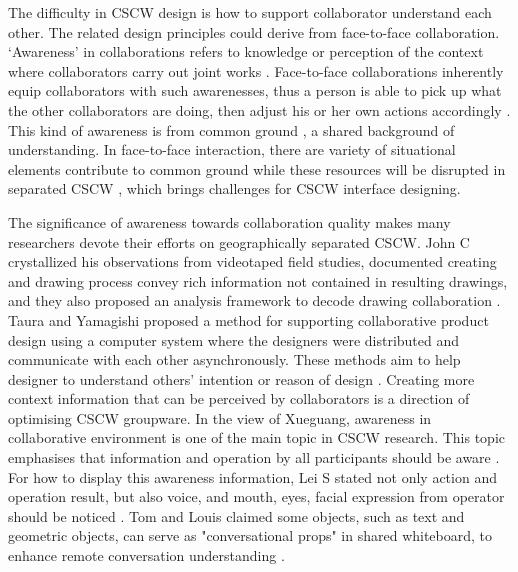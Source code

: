 \documentclass[12pt,twoside]{article}
\begin{document}
The difficulty in CSCW design is how to support collaborator understand each other. The related design principles could derive from face-to-face collaboration. ‘Awareness’ in collaborations refers to knowledge or perception of the context where collaborators carry out joint works \cite{gellersen2002multi}. Face-to-face collaborations inherently equip collaborators with such awarenesses, thus a person is able to pick up what the other collaborators are doing, then adjust his or her own actions accordingly \cite{gutwin2002descriptive}. This kind of awareness is from common ground \cite{clark1996using}, a shared background of understanding. In face-to-face interaction, there are variety of situational elements contribute to common ground while these resources will be disrupted in separated CSCW \cite{tang1991findings}, which brings challenges for CSCW interface designing. 

The significance of awareness towards collaboration quality makes many researchers devote their efforts on geographically separated CSCW. John C crystallized his observations from videotaped field studies, documented creating and drawing process convey rich information not contained in resulting drawings, and they also proposed an analysis framework to decode drawing collaboration \cite{tang1991findings}. Taura and Yamagishi proposed a method for supporting collaborative product design using a computer system where the designers were distributed and communicate with each other asynchronously. These methods aim to help designer to understand others’ intention or reason of design \cite{taura1997collaboration}. Creating more context information that can be perceived by collaborators is a direction of optimising CSCW groupware. In the view of Xueguang, awareness in collaborative environment is one of the main topic in CSCW research. This topic emphasises that information and operation by all participants should be aware \cite{xueguang2004research}. For how to display this awareness information, Lei S stated not only action and operation result, but also voice, and mouth, eyes, facial expression from operator should be noticed \cite{lei2002human}. Tom and Louis claimed some objects, such as text and geometric objects, can serve as "conversational props" in shared whiteboard, to enhance remote conversation understanding \cite{brinck1992collaborative}. 
\end{document}
